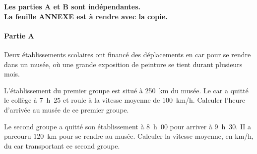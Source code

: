 \textbf{Les parties A et B sont indépendantes.\\ La feuille ANNEXE  est à rendre avec la copie.}
 \paragraph{Partie A}\hfill\newline
Deux établissements scolaires ont financé des déplacements en car pour se rendre dans un musée, où une grande exposition de peinture se tient durant plusieurs mois.
\begin{myenumerate}
\item  L'établissement du premier groupe est situé à 250~km du musée. Le car a quitté le collège à 7~h~25 et roule à la vitesse moyenne de 100~km/h. Calculer l'heure d'arrivée au musée de ce premier groupe.
\item  Le second groupe a quitté son établissement à 8~h~00 pour arriver à 9~h~30. II a parcouru 120~km pour se rendre au musée. Calculer la vitesse moyenne, en km/h, du car transportant ce second groupe.
\end{myenumerate}
